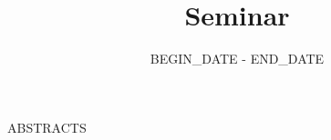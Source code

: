 \documentclass[a4paper]{article}
\title{Seminar}
\date{{{ BEGIN_DATE }} - {{ END_DATE }}}
\begin{document}
\maketitle

{{ ABSTRACTS }}
\end{document}
